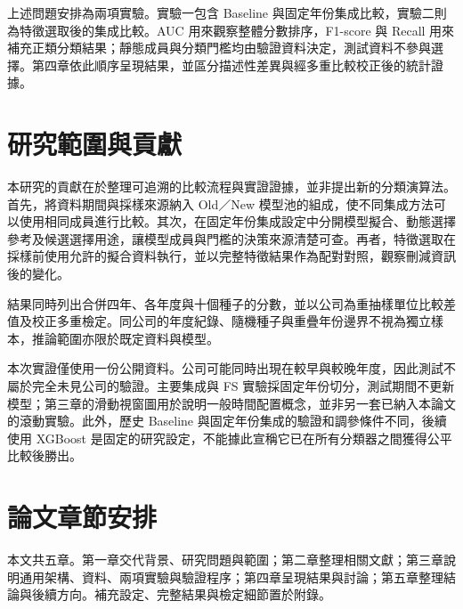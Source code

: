 上述問題安排為兩項實驗。實驗一包含 Baseline 與固定年份集成比較，實驗二則為特徵選取後的集成比較。AUC 用來觀察整體分數排序，F1-score 與 Recall 用來補充正類分類結果；靜態成員與分類門檻均由驗證資料決定，測試資料不參與選擇。第四章依此順序呈現結果，並區分描述性差異與經多重比較校正後的統計證據。

\section{研究範圍與貢獻}

本研究的貢獻在於整理可追溯的比較流程與實證證據，並非提出新的分類演算法。首先，將資料期間與採樣來源納入 Old／New 模型池的組成，使不同集成方法可以使用相同成員進行比較。其次，在固定年份集成設定中分開模型擬合、動態選擇參考及候選選擇用途，讓模型成員與門檻的決策來源清楚可查。再者，特徵選取在採樣前使用允許的擬合資料執行，並以完整特徵結果作為配對對照，觀察刪減資訊後的變化。

結果同時列出合併四年、各年度與十個種子的分數，並以公司為重抽樣單位比較差值及校正多重檢定。同公司的年度紀錄、隨機種子與重疊年份邊界不視為獨立樣本，推論範圍亦限於既定資料與模型。

本次實證僅使用一份公開資料。公司可能同時出現在較早與較晚年度，因此測試不屬於完全未見公司的驗證。主要集成與 FS 實驗採固定年份切分，測試期間不更新模型；第三章的滑動視窗圖用於說明一般時間配置概念，並非另一套已納入本論文的滾動實驗。此外，歷史 Baseline 與固定年份集成的驗證和調參條件不同，後續使用 XGBoost 是固定的研究設定，不能據此宣稱它已在所有分類器之間獲得公平比較後勝出。

\section{論文章節安排}

本文共五章。第一章交代背景、研究問題與範圍；第二章整理相關文獻；第三章說明通用架構、資料、兩項實驗與驗證程序；第四章呈現結果與討論；第五章整理結論與後續方向。補充設定、完整結果與檢定細節置於附錄。
\endgroup
